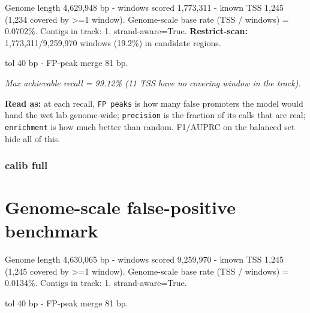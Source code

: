 \documentclass[10pt]{article}
\begin{document}
Genome length 4,629,948 bp - windows scored 1,773,311 - known TSS 1,245 (1,234 covered by >=1 window). Genome-scale base rate (TSS / windows) = 0.0702\%. Contigs in track: 1. strand-aware=True. \textbf{Restrict-scan:} 1,773,311/9,259,970 windows (19.2\%) in candidate regions.

tol 40 bp - FP-peak merge 81 bp.

\begin{center}
\end{center}

{\itshape Max achievable recall = 99.12\% (11 TSS have no covering window in the track).}

\textbf{Read as:} at each recall, \texttt{FP peaks} is how many false promoters the model would hand the wet lab genome-wide; \texttt{precision} is the fraction of its calls that are real; \texttt{enrichment} is how much better than random. F1/AUPRC on the balanced set hide all of this.

\subsubsection*{calib \textperiodcentered{} full}
\section*{Genome-scale false-positive benchmark}

Genome length 4,630,065 bp - windows scored 9,259,970 - known TSS 1,245 (1,245 covered by >=1 window). Genome-scale base rate (TSS / windows) = 0.0134\%. Contigs in track: 1. strand-aware=True.

tol 40 bp - FP-peak merge 81 bp.
\end{document}
